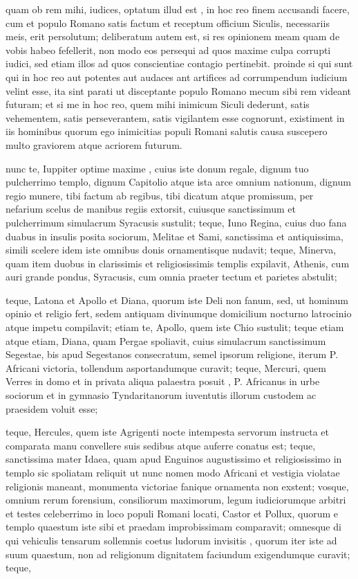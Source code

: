  quam ob rem mihi, iudices, optatum illud est , in hoc reo finem accusandi facere, cum et populo Romano satis factum et receptum officium Siculis, necessariis meis, erit persolutum; deliberatum autem est, si res opinionem meam quam de vobis habeo fefellerit, non modo eos persequi ad quos maxime culpa corrupti iudici, sed etiam illos ad quos conscientiae contagio pertinebit. proinde si qui sunt qui in hoc reo aut potentes aut audaces ant artifices ad corrumpendum iudicium velint esse, ita sint parati ut disceptante populo Romano mecum sibi rem videant futuram; et si me in hoc reo, quem mihi inimicum Siculi dederunt, satis vehementem, satis perseverantem, satis vigilantem esse cognorunt, existiment in iis hominibus quorum ego inimicitias populi Romani salutis causa suscepero multo graviorem atque acriorem futurum.

 nunc te, Iuppiter optime maxime , cuius iste donum regale, dignum tuo pulcherrimo templo, dignum Capitolio atque ista arce omnium nationum, dignum regio munere, tibi factum ab regibus, tibi dicatum atque promissum, per nefarium scelus de manibus regiis extorsit, cuiusque sanctissimum et pulcherrimum simulacrum Syracusis sustulit; teque, Iuno Regina, cuius duo fana duabus in insulis posita sociorum, Melitae et Sami, sanctissima et antiquissima, simili scelere idem iste omnibus donis ornamentisque nudavit; teque, Minerva, quam item duobus in clarissimis et religiosissimis templis expilavit, Athenis, cum auri grande pondus, Syracusis, cum omnia praeter tectum et parietes abstulit;

 teque, Latona et Apollo et Diana, quorum iste Deli non fanum, sed, ut hominum opinio et religio fert, sedem antiquam divinumque domicilium nocturno latrocinio atque impetu compilavit; etiam te, Apollo, quem iste Chio sustulit; teque etiam atque etiam, Diana, quam Pergae spoliavit, cuius simulacrum sanctissimum Segestae, bis apud Segestanos consecratum, semel ipsorum religione, iterum P. Africani victoria, tollendum asportandumque curavit; teque, Mercuri, quem Verres in domo et in privata aliqua palaestra posuit , P. Africanus in urbe sociorum et in gymnasio Tyndaritanorum iuventutis illorum custodem ac praesidem voluit esse;

 teque, Hercules, quem iste Agrigenti nocte intempesta servorum instructa et comparata manu convellere suis sedibus atque auferre conatus est; teque, sanctissima mater Idaea, quam apud Enguinos augustissimo et religiosissimo in templo sic spoliatam reliquit ut nunc nomen modo Africani et vestigia violatae religionis maneant, monumenta victoriae fanique ornamenta non exstent; vosque, omnium rerum forensium, consiliorum maximorum, legum iudiciorumque arbitri et testes celeberrimo in loco populi Romani locati, Castor et Pollux, quorum e templo quaestum iste sibi et praedam improbissimam comparavit; omnesque di qui vehiculis tensarum sollemnis coetus ludorum invisitis , quorum iter iste ad suum quaestum, non ad religionum dignitatem faciundum exigendumque curavit; teque,

